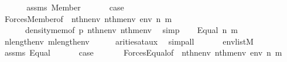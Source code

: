 \begin{isabellebody}
\ \ \isamarkupfalse%
\isanewline
\ \ \isamarkupfalse%
\ assms\ Member\isanewline
\ \ \isamarkupfalse%
\isanewline
\ \ \isamarkupfalse%
\ {\isacharquery}{\kern0pt}case\ \isanewline
\ \ \ \ \isamarkupfalse%
\ Forces{\isacharunderscore}{\kern0pt}Member{\isacharbrackleft}{\kern0pt}of\ {\isacharunderscore}{\kern0pt}\ {\isachardoublequoteopen}nth{\isacharparenleft}{\kern0pt}n{\isacharcomma}{\kern0pt}env{\isacharparenright}{\kern0pt}{\isachardoublequoteclose}\ {\isachardoublequoteopen}nth{\isacharparenleft}{\kern0pt}m{\isacharcomma}{\kern0pt}env{\isacharparenright}{\kern0pt}{\isachardoublequoteclose}\ env\ n\ m{\isacharbrackright}{\kern0pt}\isanewline
\ \ \ \ \ \ density{\isacharunderscore}{\kern0pt}mem{\isacharbrackleft}{\kern0pt}of\ p\ {\isachardoublequoteopen}nth{\isacharparenleft}{\kern0pt}n{\isacharcomma}{\kern0pt}env{\isacharparenright}{\kern0pt}{\isachardoublequoteclose}\ {\isachardoublequoteopen}nth{\isacharparenleft}{\kern0pt}m{\isacharcomma}{\kern0pt}env{\isacharparenright}{\kern0pt}{\isachardoublequoteclose}{\isacharbrackright}{\kern0pt}\ \isamarkupfalse%
\ simp\isanewline
{}\isamarkupfalse%
\isanewline
\ \ \isamarkupfalse%
\ {\isacharparenleft}{\kern0pt}Equal\ n\ m{\isacharparenright}{\kern0pt}\isanewline
\ \ \isamarkupfalse%
\isanewline
\ \ \isamarkupfalse%
\ {\isachardoublequoteopen}n{\isacharless}{\kern0pt}length{\isacharparenleft}{\kern0pt}env{\isacharparenright}{\kern0pt}{\isachardoublequoteclose}\ {\isachardoublequoteopen}m{\isacharless}{\kern0pt}length{\isacharparenleft}{\kern0pt}env{\isacharparenright}{\kern0pt}{\isachardoublequoteclose}\isanewline
\ \ \ \ \isamarkupfalse%
\ arities{\isacharunderscore}{\kern0pt}at{\isacharunderscore}{\kern0pt}aux\ \isamarkupfalse%
\ simp{\isacharunderscore}{\kern0pt}all\isanewline
\ \ \isamarkupfalse%
\isanewline
\ \ \isamarkupfalse%
\ {\isachardoublequoteopen}env{\isasymin}list{\isacharparenleft}{\kern0pt}M{\isacharparenright}{\kern0pt}{\isachardoublequoteclose}\isanewline
\ \ \isamarkupfalse%
\isanewline
\ \ \isamarkupfalse%
\ assms\ Equal\isanewline
\ \ \isamarkupfalse%
\isanewline
\ \ \isamarkupfalse%
\ {\isacharquery}{\kern0pt}case\ \isanewline
\ \ \ \ \isamarkupfalse%
\ Forces{\isacharunderscore}{\kern0pt}Equal{\isacharbrackleft}{\kern0pt}of\ {\isacharunderscore}{\kern0pt}\ {\isachardoublequoteopen}nth{\isacharparenleft}{\kern0pt}n{\isacharcomma}{\kern0pt}env{\isacharparenright}{\kern0pt}{\isachardoublequoteclose}\ {\isachardoublequoteopen}nth{\isacharparenleft}{\kern0pt}m{\isacharcomma}{\kern0pt}env{\isacharparenright}{\kern0pt}{\isachardoublequoteclose}\ env\ n\ m{\isacharbrackright}{\kern0pt}\isanewline

\end{isabellebody}
